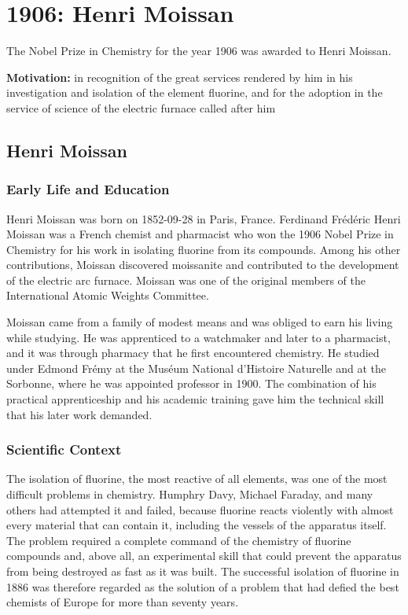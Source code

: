\chapter{1906: Henri Moissan}
\label{chap:chemistry1906}

The Nobel Prize in Chemistry for the year 1906 was awarded to Henri Moissan.

\textbf{Motivation:}
in recognition of the great services rendered by him in his investigation and isolation of the element fluorine, and for the adoption in the service of science of the electric furnace called after him

\section{Henri Moissan}

\subsection*{Early Life and Education}

Henri Moissan was born on 1852-09-28 in Paris, France.
Ferdinand Frédéric Henri Moissan was a French chemist and pharmacist who won the 1906 Nobel Prize in Chemistry for his work in isolating fluorine from its compounds. Among his other contributions, Moissan discovered moissanite and contributed to the development of the electric arc furnace. Moissan was one of the original members of the International Atomic Weights Committee.

Moissan came from a family of modest means and was obliged to earn his living while studying. He was apprenticed to a watchmaker and later to a pharmacist, and it was through pharmacy that he first encountered chemistry. He studied under Edmond Frémy at the Muséum National d'Histoire Naturelle and at the Sorbonne, where he was appointed professor in 1900. The combination of his practical apprenticeship and his academic training gave him the technical skill that his later work demanded.

\subsection*{Scientific Context}

The isolation of fluorine, the most reactive of all elements, was one of the most difficult problems in chemistry. Humphry Davy, Michael Faraday, and many others had attempted it and failed, because fluorine reacts violently with almost every material that can contain it, including the vessels of the apparatus itself. The problem required a complete command of the chemistry of fluorine compounds and, above all, an experimental skill that could prevent the apparatus from being destroyed as fast as it was built. The successful isolation of fluorine in 1886 was therefore regarded as the solution of a problem that had defied the best chemists of Europe for more than seventy years.

